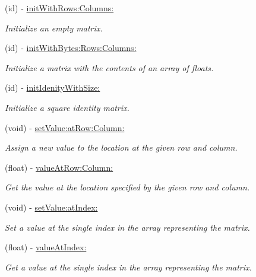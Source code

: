 \begin{DoxyCompactItemize}
\item 
(id) -\/ \hyperlink{interface_r_r_matrix2_d_ab604425fdf51b0fb71763c5b6114c9d1}{init\-With\-Rows\-:\-Columns\-:}
\begin{DoxyCompactList}\small\item\em Initialize an empty matrix. \end{DoxyCompactList}\item 
(id) -\/ \hyperlink{interface_r_r_matrix2_d_ab7116241082df2892758a9633ef88495}{init\-With\-Bytes\-:\-Rows\-:\-Columns\-:}
\begin{DoxyCompactList}\small\item\em Initialize a matrix with the contents of an array of floats. \end{DoxyCompactList}\item 
(id) -\/ \hyperlink{interface_r_r_matrix2_d_a01290dae601c6f39f96b3d8c3d2bbf24}{init\-Idenity\-With\-Size\-:}
\begin{DoxyCompactList}\small\item\em Initialize a square identity matrix. \end{DoxyCompactList}\item 
(void) -\/ \hyperlink{interface_r_r_matrix2_d_a54ba8d2366708bc06a92257e632e5d1e}{set\-Value\-:at\-Row\-:\-Column\-:}
\begin{DoxyCompactList}\small\item\em Assign a new value to the location at the given row and column. \end{DoxyCompactList}\item 
(float) -\/ \hyperlink{interface_r_r_matrix2_d_a8e1d370aba97cdde1f3ce62a55e40bb2}{value\-At\-Row\-:\-Column\-:}
\begin{DoxyCompactList}\small\item\em Get the value at the location specified by the given row and column. \end{DoxyCompactList}\item 
(void) -\/ \hyperlink{interface_r_r_matrix2_d_a1440c2b1ae6907bbb6f867e05d1c72af}{set\-Value\-:at\-Index\-:}
\begin{DoxyCompactList}\small\item\em Set a value at the single index in the array representing the matrix. \end{DoxyCompactList}\item 
(float) -\/ \hyperlink{interface_r_r_matrix2_d_a8ded74e5cdda75cd6128d971d3a10ace}{value\-At\-Index\-:}
\begin{DoxyCompactList}\small\item\em Get a value at the single index in the array representing the matrix. \end{DoxyCompactList}\item 

\end{DoxyCompactItemize}
